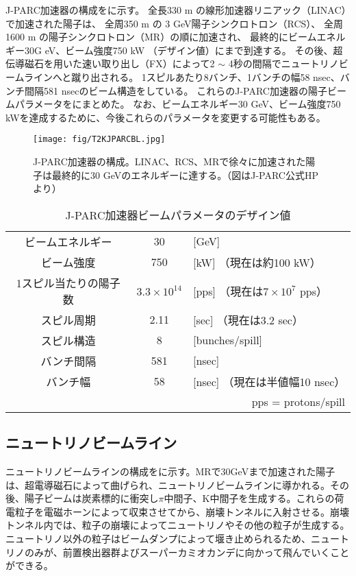 J-PARC加速器の構成をに示す。
全長330 m の線形加速器リニアック（LINAC）で加速された陽子は、
全周350 m の 3 GeV陽子シンクロトロン（RCS）、
全周1600 m の陽子シンクロトロン（MR）の順に加速され、
最終的にビームエネルギー30G eV、ビーム強度750 kW （デザイン値）にまで到達する。
その後、超伝導磁石を用いた速い取り出し（FX）によって2 $\sim$ 4秒の間隔でニュートリノビームラインへと蹴り出される。
1スピルあたり8バンチ、1バンチの幅58 nsec、バンチ間隔581 nsecのビーム構造をしている。
これらのJ-PARC加速器の陽子ビームパラメータをにまとめた。
なお、ビームエネルギー30 GeV、ビーム強度750 kWを達成するために、今後これらのパラメータを変更する可能性もある。

\begin{figure}[htbp]
\centering
\texttt{[image: fig/T2KJPARCBL.jpg]}
\caption[J-PARC加速器の構成]{J-PARC加速器の構成。LINAC、RCS、MRで徐々に加速された陽子は最終的に30 GeVのエネルギーに達する。（図はJ-PARC公式HPより）}
\label{JPARC}
\end{figure}

\begin{table}[htbp]
\caption[J-PARC加速器ビームパラメータのデザイン値]{J-PARC加速器ビームパラメータのデザイン値}
\begin{center}
\begin{tabular}{ccl}
\hline \hline
ビームエネルギー & 30 & [GeV]\\
ビーム強度 & 750 &[kW] （現在は約100 kW）\\
1スピル当たりの陽子数 & $3.3 \times 10^{14}$ & [pps] （現在は$7\times10^{7}$ pps）\\
スピル周期 & 2.11 & [sec] （現在は3.2 sec）\\
スピル構造 & 8 &[bunches/spill]\\
バンチ間隔 & 581 & [nsec]\\
バンチ幅 & 58 & [nsec] （現在は半値幅10 nsec）\\
\hline \hline
\multicolumn{3}{r}{pps = protons/spill}\\
\end{tabular}
\end{center}
\label{JPARCBeamlineSpec}
\end{table}%

\newpage
\subsection{ニュートリノビームライン}
ニュートリノビームラインの構成をに示す。MRで30GeVまで加速された陽子は、超電導磁石によって曲げられ、ニュートリノビームラインに導かれる。その後、陽子ビームは炭素標的に衝突し$\pi$中間子、K中間子を生成する。これらの荷電粒子を電磁ホーンによって収束させてから、崩壊トンネルに入射させる。崩壊トンネル内では、粒子の崩壊によってニュートリノやその他の粒子が生成する。ニュートリノ以外の粒子はビームダンプによって堰き止められるため、ニュートリノのみが、前置検出器群よびスーパーカミオカンデに向かって飛んでいくことができる。


